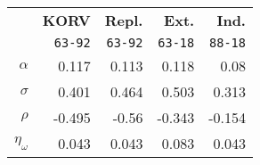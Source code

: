 \begin{tabular}{rrrrr}
  \hline\hline
   & \textbf{KORV} & \textbf{Repl.} & \textbf{Ext.} & \textbf{Ind.} \\
   & \texttt{63-92} & \texttt{63-92} & \texttt{63-18} & \texttt{88-18} \\\hline
  $\alpha$ & 0.117 & 0.113 & 0.118 & 0.08 \\
  $\sigma$ & 0.401 & 0.464 & 0.503 & 0.313 \\
  $\rho$ & -0.495 & -0.56 & -0.343 & -0.154 \\
  $\eta_\omega$ & 0.043 & 0.043 & 0.083 & 0.043 \\\hline\hline
\end{tabular}
